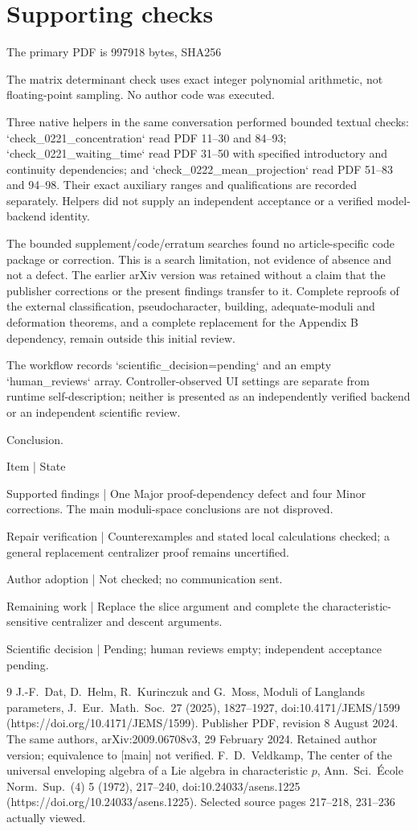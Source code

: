 \documentclass[10pt]{article}
\begin{document}
\section*{Supporting checks}
The primary PDF is 997918 bytes, SHA256\par
The matrix determinant check uses exact integer polynomial arithmetic, not floating-point sampling. No author code was executed.\par
Three native helpers in the same conversation performed bounded textual checks: `check\_0221\_concentration` read PDF 11–30 and 84–93; `check\_0221\_waiting\_time` read PDF 31–50 with specified introductory and continuity dependencies; and `check\_0222\_mean\_projection` read PDF 51–83 and 94–98. Their exact auxiliary ranges and qualifications are recorded separately. Helpers did not supply an independent acceptance or a verified model-backend identity.\par
The bounded supplement/code/erratum searches found no article-specific code package or correction. This is a search limitation, not evidence of absence and not a defect. The earlier arXiv version was retained without a claim that the publisher corrections or the present findings transfer to it. Complete reproofs of the external classification, pseudocharacter, building, adequate-moduli and deformation theorems, and a complete replacement for the Appendix B dependency, remain outside this initial review.\par
The workflow records `scientific\_decision=pending` and an empty `human\_reviews` array. Controller-observed UI settings are separate from runtime self-description; neither is presented as an independently verified backend or an independent scientific review.\par
Conclusion.\par
Item | State\par
Supported findings | One Major proof-dependency defect and four Minor corrections. The main moduli-space conclusions are not disproved.\par
Repair verification | Counterexamples and stated local calculations checked; a general replacement centralizer proof remains uncertified.\par
Author adoption | Not checked; no communication sent.\par
Remaining work | Replace the slice argument and complete the characteristic-sensitive centralizer and descent arguments.\par
Scientific decision | Pending; human reviews empty; independent acceptance pending.\par
9 J.-F. Dat, D. Helm, R. Kurinczuk and G. Moss, Moduli of Langlands parameters, J. Eur. Math. Soc. 27 (2025), 1827–1927, doi:10.4171/JEMS/1599 (https://doi.org/10.4171/JEMS/1599). Publisher PDF, revision 8 August 2024. The same authors, arXiv:2009.06708v3, 29 February 2024. Retained author version; equivalence to [main] not verified. F. D. Veldkamp, The center of the universal enveloping algebra of a Lie algebra in characteristic \(p\), Ann. Sci. École Norm. Sup. (4) 5 (1972), 217–240, doi:10.24033/asens.1225 (https://doi.org/10.24033/asens.1225). Selected source pages 217–218, 231–236 actually viewed.\par
\end{document}
